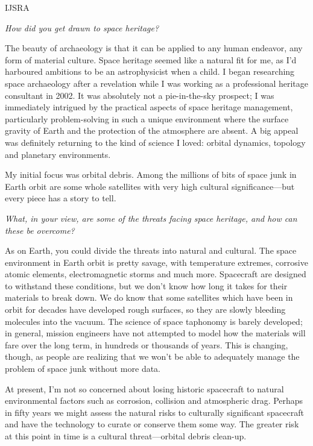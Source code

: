 \begin{labeling}{IJSRA}
	\item[IJSRA (International Journal of Student Research in Archaeology)] \emph{How did you get drawn to space heritage?}

	\item[Alice Gorman (AG)] The beauty of archaeology is that it can be applied to any human endeavor, any form of material culture. Space heritage seemed like a natural fit for me, as I’d harboured ambitions to be an astrophysicist when a child. I began researching space archaeology after a revelation while I was working as a professional heritage consultant in 2002. It was absolutely not a pie-in-the-sky prospect; I was immediately intrigued by the practical aspects of space heritage management, particularly problem-solving in such a unique environment where the surface gravity of Earth and the protection of the atmosphere are absent. A big appeal was definitely returning to the kind of science I loved: orbital dynamics, topology and planetary environments.

	My initial focus was orbital debris. Among the millions of bits of space junk in Earth orbit are some whole satellites with very high cultural significance—but every piece has a story to tell.

	\item[IJSRA] \emph{What, in your view, are some of the threats facing space heritage, and how can these be overcome?}

	\item[AG] As on Earth, you could divide the threats into natural and cultural. The space environment in Earth orbit is pretty savage, with temperature extremes, corrosive atomic elements, electromagnetic storms and much more. Spacecraft are designed to withstand these conditions, but we don’t know how long it takes for their materials to break down. We do know that some satellites which have been in orbit for decades have developed rough surfaces, so they are slowly bleeding molecules into the vacuum. The science of space taphonomy is barely developed; in general, mission engineers have not attempted to model how the materials will fare over the long term, in hundreds or thousands of years. This is changing, though, as people are realizing that we won’t be able to adequately manage the problem of space junk without more data.

	At present, I’m not so concerned about losing historic spacecraft to natural environmental factors such as corrosion, collision and atmospheric drag. Perhaps in fifty years we might assess the natural risks to culturally significant spacecraft and have the technology to curate or conserve them some way. The greater risk at this point in time is a cultural threat—orbital debris clean-up.


\end{labeling}

